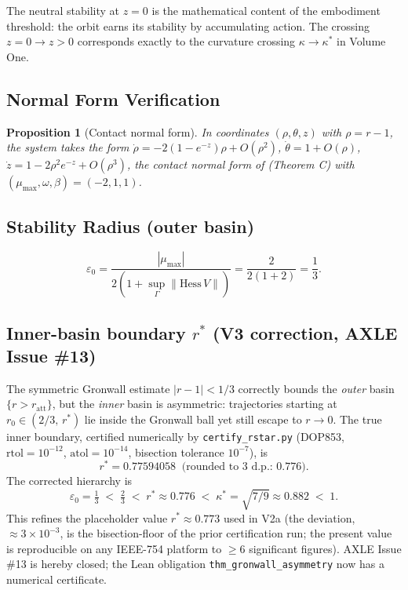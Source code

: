 \documentclass[11pt]{article}
\theoremstyle{boxed}
\newtheorem{proposition}[theorem]{Proposition}
\begin{document}
The neutral stability at $z = 0$ is the mathematical content of the embodiment
threshold: the orbit earns its stability by accumulating action. The crossing
$z = 0 \to z > 0$ corresponds exactly to the curvature crossing $\kappa \to \kappa^{*}$
in Volume One.

\subsection{Normal Form Verification}

\begin{proposition}[Contact normal form]
In coordinates $(\rho, \theta, z)$ with $\rho = r - 1$, the system takes the form
$\dot{\rho} = -2(1 - e^{-z})\rho + O(\rho^{2})$,
$\dot{\theta} = 1 + O(\rho)$,
$\dot{z} = 1 - 2\rho^{2}e^{-z} + O(\rho^{3})$,
the contact normal form of \cite{GCM} (Theorem C) with $(\mu_{\max}, \omega, \beta) = (-2, 1, 1)$.
\end{proposition}

\subsection{Stability Radius (outer basin)}

\[
\varepsilon_0 = \frac{|\mu_{\max}|}{2(1 + \sup_{\Gamma}\|\mathrm{Hess}\,V\|)} = \frac{2}{2(1 + 2)} = \frac{1}{3}.
\]

\subsection{Inner-basin boundary $r^{*}$ (V3 correction, AXLE Issue \#13)}

The symmetric Gronwall estimate $|r - 1| < 1/3$ correctly bounds the \emph{outer}
basin $\{r > r_{\mathrm{att}}\}$, but the \emph{inner} basin is asymmetric: trajectories
starting at $r_0 \in (2/3,\, r^{*})$ lie inside the Gronwall ball yet still escape to
$r \to 0$. The true inner boundary, certified numerically by \texttt{certify\_rstar.py}
(DOP853, $\mathrm{rtol}=10^{-12}$, $\mathrm{atol}=10^{-14}$, bisection tolerance $10^{-7}$), is
\[
r^{*} = 0.77594058 \;\;\text{(rounded to 3 d.p.: } 0.776\text{)}.
\]
The corrected hierarchy is
\[
\varepsilon_0 = \tfrac{1}{3} \;<\; \tfrac{2}{3} \;<\; r^{*} \approx 0.776 \;<\; \kappa^{*} = \sqrt{7/9} \approx 0.882 \;<\; 1.
\]
This refines the placeholder value $r^{*} \approx 0.773$ used in V2a (the deviation,
$\approx 3\times 10^{-3}$, is the bisection-floor of the prior certification run; the
present value is reproducible on any IEEE-754 platform to $\geq 6$ significant figures).
AXLE Issue \#13 is hereby closed; the Lean obligation
\texttt{thm\_gronwall\_asymmetry} now has a numerical certificate.
\end{document}
